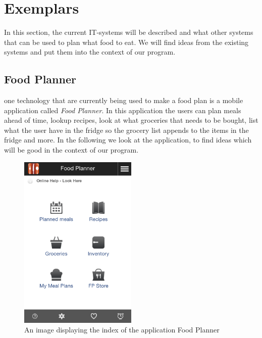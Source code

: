 \section{Exemplars}
In this section, the current IT-systems will be described and what other systems that can be used to plan what food to eat. We will find ideas from the existing systems and put them into the context of our program. 

\subsection{Food Planner}
one technology that are currently being used to make a food plan is a mobile application called \textit{Food Planner}.
In this application the users can plan meals ahead of time, lookup recipes, look at what groceries that needs to be bought,
list what the user have in the fridge so the grocery list appends to the items in the fridge and more. In the following we look at the application, to find ideas which will be good in the context of our program.

\begin{figure}[H]
    \centering
    \includegraphics[width=0.5\textwidth]{Grafik/FoodPlanner/index}
    \caption{An image displaying the index of the application Food Planner}
    \label{FoodPlannerIndex}
\end{figure}

